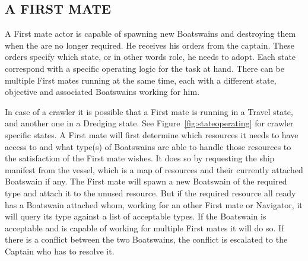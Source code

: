 \subsection{A FIRST MATE}\label{seq:first mate}

A First mate actor is capable of spawning new Boatswains and destroying them when the are no longer required. He
receives his orders from the captain. These orders specify which state, or in other words role, he needs to adopt. Each
state correspond with a specific operating logic for the task at hand. There can be multiple First mates running at the
same time, each with a different state, objective and associated Boatswains working for him.

In case of a crawler it is possible that a First mate is running in a Travel state, and another one in a Dredging state.
See Figure~\ref{fig:stateoperating} for crawler specific states. A First mate will first determine which resources it
needs to have access to and what type(s) of Boatswains are able to handle those resources to the satisfaction of the
First mate wishes. It does so by requesting the ship manifest from the vessel, which is a map of resources and their
currently attached Boatswain if any. The First mate will spawn a new Boatswain of the required type and attach it to the
unused resource. But if the required resource all ready has a Boatswain attached whom, working for an other First mate
or Navigator, it will query its type against a list of acceptable types. If the Boatswain is acceptable and is capable
of working for multiple First mates it will do so. If there is a conflict between the two Boatswains, the conflict is
escalated to the Captain who has to resolve it.

